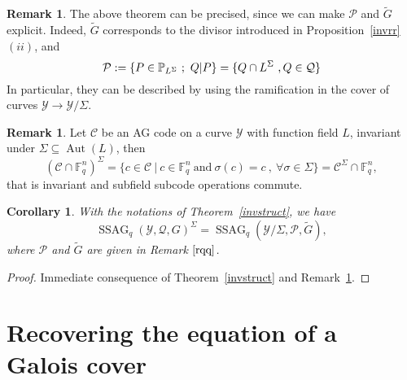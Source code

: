 \documentclass[10pt]{article}
\newtheorem{coro1}[thm]{Corollary}
\theoremstyle{definition}
\newtheorem{rq1}[thm]{Remark}
\theoremstyle{definition}
\theoremstyle{definition}
\newcommand{\PP}{\mathbb{P}}
\newcommand{\fq}{\mathbb{F}_q}
\newcommand{\su}{\subseteq}
\newcommand{\Y}{\mathcal{Y}}
\newcommand{\PR}{\mathcal{P}}
\newcommand{\QR}{\mathcal{Q}}
\newcommand{\Aut}{\operatorname{Aut}}
\newcommand{\ssag}{\operatorname{SSAG}}
\begin{document}
\begin{rq1} \label{rqq}
The above theorem can be precised, since we can make $\PR$ and $\tilde{G}$ explicit. Indeed, $\tilde{G}$ corresponds to the divisor introduced in Proposition~\ref{invrr} $(ii)$, and \[\PR := \\ \{P \in \PP_{L^{\Sigma}} \ ; \ Q|P\} = \{Q \cap L^{\Sigma} \ , Q \in \QR\} \] In particular, they can be described by using the ramification in the cover of curves $\Y \longrightarrow \Y/\Sigma$.
\end{rq1}

\begin{rq1} \label{commute}
Let $\mathcal{C}$ be an AG code on a curve $\Y$ with function field $L$, invariant under $\Sigma \su \Aut(L)$, then
\[(\mathcal{C}\cap \fq^n)^{\Sigma} = \{c \in \mathcal{C} \ | \ c \in \fq^n \ \textrm{and} \ \sigma(c)=c \ , \ \forall \sigma \in \Sigma\} = \mathcal{C}^{\Sigma} \cap \fq^n,\]
that is invariant and subfield subcode operations commute.
\end{rq1}

\begin{coro1} \label{ssag}
With the notations of Theorem~\ref{invstruct}, we have
\[\ssag_q(\Y,\QR,G)^{\Sigma} = \ssag_q(\Y/\Sigma,\PR,\tilde{G}),\]
where $\PR$ and $\tilde{G}$ are given in Remark $\ref{rqq}$.
\end{coro1}

\begin{proof}
Immediate consequence of Theorem~\ref{invstruct} and Remark~\ref{commute}.
\end{proof}


\section{Recovering the equation of a Galois cover} \label{sectionfour}
\end{document}
